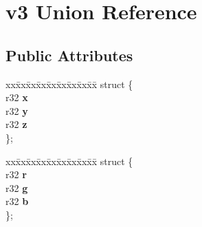 \hypertarget{unionv3}{}\section{v3 Union Reference}
\label{unionv3}
\subsection*{Public Attributes}
\begin{DoxyCompactItemize}
\item 
\mbox{\label{unionv3_aabbcebeeee0968227b858381386e1bea}} 
\begin{tabbing}
xx\=xx\=xx\=xx\=xx\=xx\=xx\=xx\=xx\=\kill
struct \{\\
\mbox{\label{unionv3_a2170a4056ef49546ba682b7a85aafb08}} 
r32 {\bfseries x}\\
\mbox{\label{unionv3_a8c9b8f0543900fa7bf53b427f52ab339}} 
r32 {\bfseries y}\\
\mbox{\label{unionv3_a4ead9ea06712c6c64a598af922be62ca}} 
r32 {\bfseries z}\\
\}; \\

\end{tabbing}\item 
\mbox{\label{unionv3_a07850aa927870005a428fd9e58590999}} 
\begin{tabbing}
xx\=xx\=xx\=xx\=xx\=xx\=xx\=xx\=xx\=\kill
struct \{\\
\mbox{\label{unionv3_ad25e1c3ae2394f42d72be6c31e637be8}} 
r32 {\bfseries r}\\
\mbox{\label{unionv3_a302b0ecf7482c5be24bfbab7be080322}} 
r32 {\bfseries g}\\
\mbox{\label{unionv3_a1d328f4df7cc3c007e0ea051297b6bbb}} 
r32 {\bfseries b}\\
\}; \\


\end{tabbing}
\end{DoxyCompactItemize}
